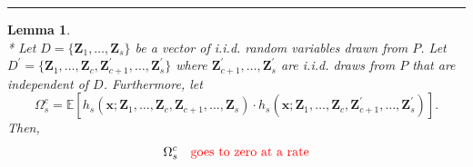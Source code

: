 \documentclass[letterpaper,10pt]{article}
\numberwithin{equation}{section}
\numberwithin{thm}{section}
\newtheorem{lem}{Lemma}
\numberwithin{lem}{section}
\numberwithin{cor}{section}
\newcommand{\E}{\mathbb{E}}
\newcommand{\1}{\mathbbm{1}}
\begin{document}
\hrule

\begin{lem}\label{lem_omega_sc}\mbox{}\\*
	Let $D = \{\mathbf{Z}_1, \dotsc, \mathbf{Z}_{s}\}$ be a vector of i.i.d. random variables drawn from $P$.
	Let $D^{\prime} = \{\mathbf{Z}_1, \dotsc, \mathbf{Z}_{c}, \mathbf{Z}_{c+1}^{\prime}, \dotsc,  \mathbf{Z}_{s}^{\prime}\}$ where $\mathbf{Z}_{c+1}^{\prime}, \dotsc,  \mathbf{Z}_{s}^{\prime}$ are i.i.d. draws from $P$ that are independent of $D$.
	Furthermore, let
	\begin{equation}
		\Omega_{s}^{c}
		= \E\left[h_{s}\left(\mathbf{x}; \mathbf{Z}_1, \ldots, \mathbf{Z}_{c}, \mathbf{Z}_{c+1}, \ldots, \mathbf{Z}_{s}\right) \cdot
			h_{s}\left(\mathbf{x}; \mathbf{Z}_1, \ldots,\mathbf{Z}_{c}, \mathbf{Z}_{c+1}^{\prime}, \ldots, \mathbf{Z}_{s}^{\prime}\right)\right].
	\end{equation}
	Then,
	\begin{equation}
		\Omega_{s}^{c}
		\quad {\color{red} \text{goes to zero at a rate}}
	\end{equation}
\end{lem}
\end{document}
